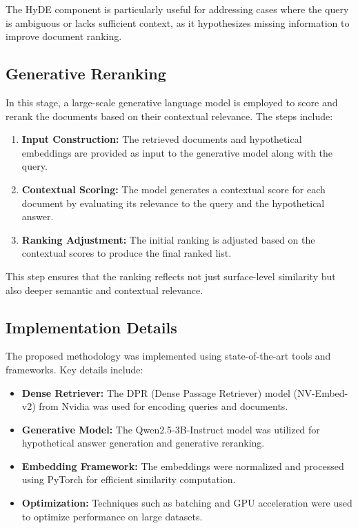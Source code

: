 The HyDE component is particularly useful for addressing cases where the query is ambiguous or lacks sufficient context, as it hypothesizes missing information to improve document ranking.

\subsection{Generative Reranking}
In this stage, a large-scale generative language model is employed to score and rerank the documents based on their contextual relevance. The steps include:
\begin{enumerate}
    \item \textbf{Input Construction:} The retrieved documents and hypothetical embeddings are provided as input to the generative model along with the query.
    \item \textbf{Contextual Scoring:} The model generates a contextual score for each document by evaluating its relevance to the query and the hypothetical answer.
    \item \textbf{Ranking Adjustment:} The initial ranking is adjusted based on the contextual scores to produce the final ranked list.
\end{enumerate}

This step ensures that the ranking reflects not just surface-level similarity but also deeper semantic and contextual relevance.

\subsection{Implementation Details}
The proposed methodology was implemented using state-of-the-art tools and frameworks. Key details include:
\begin{itemize}
    \item \textbf{Dense Retriever:} The DPR (Dense Passage Retriever) model (NV-Embed-v2)\cite{nvembed} from Nvidia was used for encoding queries and documents.
    \item \textbf{Generative Model:} The Qwen2.5-3B-Instruct\cite{qwen2.5} model was utilized for hypothetical answer generation and generative reranking.
    \item \textbf{Embedding Framework:} The embeddings were normalized and processed using PyTorch\cite{pytorch} for efficient similarity computation.
    \item \textbf{Optimization:} Techniques such as batching and GPU acceleration were used to optimize performance on large datasets.
\end{itemize}

